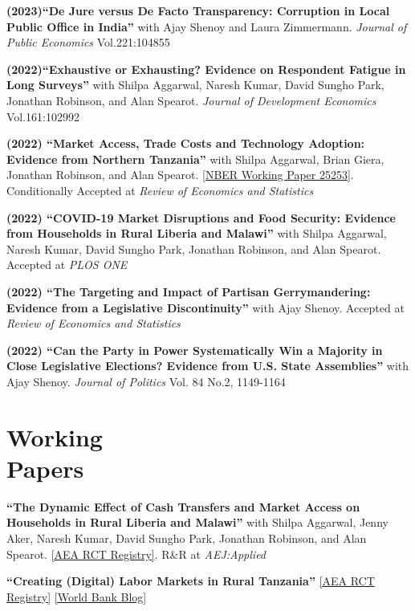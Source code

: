 \documentclass[letterpaper, margin, 10pt]{res} %
\begin{document}
\begin{resume}
{\bf (2023)``De Jure versus De Facto Transparency: Corruption in Local Public Office in India''} 
with Ajay Shenoy and Laura Zimmermann. \textit{Journal of Public Economics} Vol.221:104855

\normalsize
{\bf (2022)``Exhaustive or Exhausting? Evidence on Respondent Fatigue in Long Surveys''}
with Shilpa Aggarwal, Naresh Kumar, David Sungho Park, Jonathan Robinson, and Alan Spearot. \textit{Journal of Development Economics} Vol.161:102992


\normalsize
{\bf (2022) ``{Market Access, Trade Costs and Technology Adoption: Evidence from Northern Tanzania}''} with Shilpa Aggarwal, Brian Giera, Jonathan Robinson, and Alan Spearot. \href{https://www.nber.org/papers/w25253.pdf}{[NBER Working Paper 25253]}. Conditionally Accepted at \textit{Review of Economics and Statistics}

{\bf (2022) ``COVID-19 Market Disruptions and Food Security: Evidence from Households in Rural Liberia and Malawi''} with Shilpa Aggarwal, Naresh Kumar, David Sungho Park, Jonathan Robinson, and Alan Spearot. Accepted at \textit{PLOS ONE}

\normalsize
{\bf (2022) ``{The Targeting and Impact of Partisan Gerrymandering: Evidence from a Legislative Discontinuity}''} with Ajay Shenoy. Accepted at \textit{Review of Economics and Statistics} 

\normalsize 
{\bf  (2022) ``{Can the Party in Power Systematically Win a Majority in Close Legislative Elections? Evidence from U.S. State Assemblies}''} with Ajay Shenoy. \textit{Journal of Politics} Vol. 84 No.2, 1149-1164



\normalsize\section{\textbf{Working \\ Papers}}

\normalsize 


\normalsize 

{\bf ``{The Dynamic Effect of Cash Transfers and Market Access on Households in Rural Liberia and Malawi}''}
with Shilpa Aggarwal, Jenny Aker, Naresh Kumar, David Sungho Park, Jonathan Robinson, and Alan Spearot. \href{https://www.socialscienceregistry.org/trials/4869}{{[AEA RCT Registry]}}. R\&R at \textit{AEJ:Applied} 




{\bf ``{Creating (Digital) Labor Markets in Rural Tanzania}''} \href{https://www.socialscienceregistry.org/trials/4483}{{[AEA RCT Registry]}} \href{https://blogs.worldbank.org/impactevaluations/using-sms-transform-agricultural-labor-markets-tanzania-guest-post-dahyeon-jeong}{{[World Bank Blog]}}



\end{resume}
\end{document}

